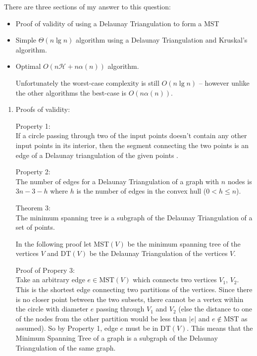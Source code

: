 \documentclass[10pt,\jkfside,a4paper]{article}
\begin{document}
\begin{enumerate}
There are three sections of my answer to this question:
\begin{itemize}

\item Proof of validity of using a Delaunay Triangulation to form a MST

\item Simple $\Theta(n\lg n)$ algorithm using a Delaunay Triangulation and Kruskal’s algorithm.

\item Optimal $O(n\mathcal{H} + n\alpha(n))$ algorithm.

Unfortunately the worst-case complexity is still $O(n \lg n)$ -- however unlike the 
other algorithms the best-case is $O(n\alpha(n))$.

\end{itemize}

\begin{enumerate}

\item Proofs of validity:

Property 1:\\
If a circle passing through two of the input points doesn't contain any other input points 
in its interior, then the segment connecting the two points is an edge of a Delaunay 
triangulation of the given points \cite{wikipedia}.

Property 2:\\
The number of edges for a Delaunay Triangulation of a graph with $n$ nodes is 
$3n - 3 - h$ where $h$ is the number of edges in the convex hull ($0 < h \leq n$).

Theorem 3:\\
The minimum spanning tree is a subgraph of the Delaunay Triangulation of a set of points.

In the following proof let MST$(V)$ be the minimum spanning tree of the vertices $V$ and DT$(V)$ 
be the Delaunay Triangulation of the vertices $V$.

Proof of Propery 3:\\
Take an arbitrary edge $e \in \text{MST}(V)$ which connects two vertices $V_1$, $V_2$. 
This is the shortest edge connecting two partitions of the vertices. Since there is no 
closer point between the two subsets, there cannot be a vertex within the circle with 
diameter $e$ passing through $V_1$ and $V_2$ (else the distance to one of the nodes from 
the other partition would be less than $|e|$ and $e \notin \text{MST}$ as assumed). So by 
Property 1, edge $e$ must be in DT$(V)$. This means that the Minimum Spanning Tree of a 
graph is a subgraph of the Delaunay Triangulation of the same graph.


\end{enumerate}
\end{enumerate}
\end{document}
